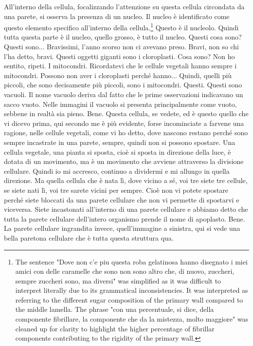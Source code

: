 \documentclass[11pt, a4paper]{article}
\begin{document}
\begin{spacing}{1.15}
All'interno della cellula, focalizzando l'attenzione su questa cellula circondata da una parete, si osserva la presenza di un nucleo. Il nucleo è identificato come questo elemento specifico all'interno della cellula.\footnote{The sentence "Dove non c'e piu questa roba gelatinosa hanno disegnato i miei amici con delle caramelle che sono non sono altro che, di nuovo, zuccheri, sempre zuccheri sono, ma diversi" was simplified as it was difficult to interpret literally due to its grammatical inconsistencies. It was interpreted as referring to the different sugar composition of the primary wall compared to the middle lamella.  The phrase "con una percentuale, si dice, della componente fibrillare, la componente che da la mistezza, molto maggiore" was cleaned up for clarity to highlight the higher percentage of fibrillar components contributing to the rigidity of the primary wall.}
Questo è il nucleolo. Quindi tutta questa parte è il nucleo, quello grosso, è tutto il nucleo. Questi cosa sono? Questi sono... Bravissimi, l'anno scorso non ci avevano preso. Bravi, non so chi l'ha detto, bravi. Questi oggetti giganti sono i cloroplasti.
Cosa sono? Non ho sentito, ripeti. I mitocondri. Ricordatevi che le cellule vegetali hanno sempre i mitocondri. Possono non aver i cloroplasti perché hanno... Quindi, quelli più piccoli, che sono decisamente più piccoli, sono i mitocondri. Questi.
Questi sono vacuoli. Il nome vacuolo deriva dal fatto che le prime osservazioni indicavano un sacco vuoto. Nelle immagini il vacuolo si presenta principalmente come vuoto, sebbene in realtà sia pieno.
Bene. Questa cellula, se vedete, ed è questo quello che vi dicevo prima, qui secondo me è più evidente, forse incominciate a farvene una ragione, nelle cellule vegetali, come vi ho detto, dove nascono restano perché sono sempre incastrate in una parete, sempre, quindi non si possono spostare. Una cellula vegetale, una pianta si sposta, cioè si sposta in direzione della luce, è dotata di un movimento, ma è un movimento che avviene attraverso la divisione cellulare. Quindi io mi accresco, continuo a dividermi e mi allungo in quella direzione. Ma quella cellula che è nata lì, dove vicino a sé, voi tre siete tre cellule, se siete nati lì, voi tre sarete vicini per sempre. Cioè non vi potete spostare perché siete bloccati da una parete cellulare che non vi permette di spostarvi e viceversa. Siete incastonati all'interno di una parete cellulare e abbiamo detto che tutta la parete cellulare dell'intero organismo prende il nome di apoplasto. Bene. La parete cellulare ingrandita invece, quell'immagine a sinistra, qui si vede una bella paretona cellulare che è tutta questa struttura qua.

\end{spacing}
\end{document}
